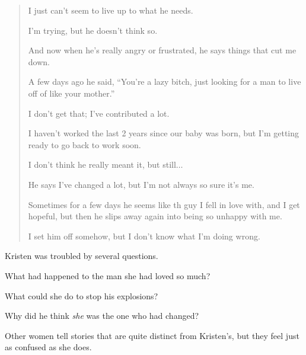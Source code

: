 \documentclass[oneside]{article}
\numberwithin{equation}{section}
\begin{document}
\begin{quotation}
    I just can't seem to live up to what he needs.
    
    I'm trying, but he doesn't think so.
    
    And now when he's really angry or frustrated, he says things that cut me down.
    
    A few days ago he said, ``You're a lazy bitch, just looking for a man to live off of like your mother.''
    
    I don't get that; I've contributed a lot.
    
    I haven't worked the last 2 years since our baby was born, but I'm getting ready to go back to work soon.
    
    I don't think he really meant it, but still$\ldots$
    
    He says I've changed a lot, but I'm not always so sure it's me.
    
    Sometimes for a few days he seems like th guy I fell in love with, and I get hopeful, but then he slips away again into being so unhappy with me.
    
    I set him off somehow, but I don't know what I'm doing wrong.
\end{quotation}
Kristen was troubled by several questions.

What had happened to the man she had loved so much?


What could she do to stop his explosions?

Why did he think \textit{she} was the one who had changed?

%
Other women tell stories that are quite distinct from Kristen's, but they feel just as confused as she does.
\end{document}
